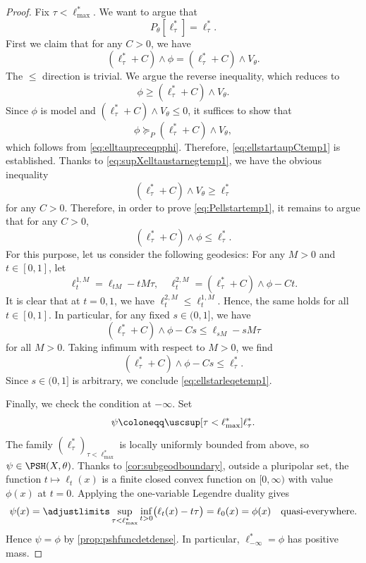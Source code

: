 \begin{proof}
    Fix $\tau<\ell^*_{\max}$. We want to argue that
    \begin{equation}\label{eq:Pellstartemp1}
        P_{\theta}\left[\ell^*_{\tau}\right]=\ell^*_{\tau}.
    \end{equation}
    First we claim that for any $C>0$, we have
    \begin{equation}\label{eq:ellstartaupCtemp1}
    (\ell^*_{\tau}+C)\land \phi=(\ell^*_{\tau}+C)\land V_{\theta}.
    \end{equation}
    The $\leq$ direction is trivial. We argue the reverse inequality, which reduces to
    \[
     \phi\geq (\ell^*_{\tau}+C)\land V_{\theta}.
    \]
    Since $\phi$ is model and $(\ell^*_{\tau}+C)\land V_{\theta}\leq 0$, it suffices to show that
    \[
    \phi\succeq_P (\ell^*_{\tau}+C)\land V_{\theta},
    \]
    which follows from \eqref{eq:elltaupreceqpphi}. Therefore, \eqref{eq:ellstartaupCtemp1} is established. Thanks to \eqref{eq:supXelltaustarnegtemp1}, we have the obvious inequality
    \[
    (\ell^*_{\tau}+C)\land V_{\theta}\geq \ell^*_{\tau}
    \]
    for any $C>0$. Therefore, in order to prove \eqref{eq:Pellstartemp1}, it remains to argue that for any $C>0$,
    \begin{equation}\label{eq:ellstarleqetemp1}
        (\ell^*_{\tau}+C)\land \phi\leq  \ell^*_{\tau}.
    \end{equation}
    For this purpose, let us consider the following geodesics: For any $M>0$ and $t\in [0,1]$, let
    \[
        \ell^{1,M}_t= \ell_{tM}-tM\tau,\quad  \ell^{2,M}_t= (\ell^*_{\tau}+C)\land \phi-Ct.
    \]
    It is clear that at $t=0,1$, we have $\ell^{2,M}_t\leq \ell^{1,M}_t$. Hence, the same holds for all $t\in [0,1]$. In particular, for any fixed $s\in (0,1]$, we have
    \[
        (\ell^*_{\tau}+C)\land \phi-Cs\leq \ell_{sM}-sM\tau
    \]
    for all $M>0$.
    Taking infimum with respect to $M>0$, we find
    \[
        (\ell^*_{\tau}+C)\land \phi-Cs\leq \ell^*_{\tau}.
    \]
    Since $s\in (0,1]$ is arbitrary, we conclude \eqref{eq:ellstarleqetemp1}.

    Finally, we check the condition at $-\infty$. Set
    \[
        \psi\coloneqq \uscsup[\tau<\ell^*_{\max}]\ell^*_{\tau}.
    \]
    The family $(\ell^*_{\tau})_{\tau<\ell^*_{\max}}$ is locally uniformly bounded from above, so $\psi\in\PSH(X,\theta)$. Thanks to \cref{cor:subgeodboundary}, outside a pluripolar set, the function $t\mapsto \ell_t(x)$ is a finite closed convex function on $[0,\infty)$ with value $\phi(x)$ at $t=0$.
    Applying the one-variable Legendre duality gives
    \[
        \psi(x)=\adjustlimits \sup_{\tau<\ell^*_{\max}}\inf_{t>0}\bigl(\ell_t(x)-t\tau\bigr)=\ell_0(x)=\phi(x)\quad \textup{quasi-everywhere}.
    \]
    Hence $\psi=\phi$ by \cref{prop:pshfuncdetdense}. In particular, $\ell^*_{-\infty}=\phi$ has positive mass.
\end{proof}


